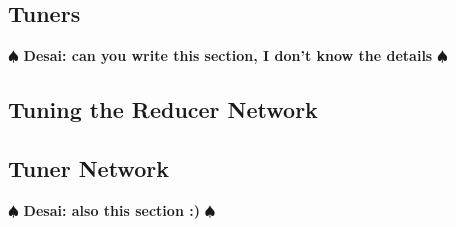 \documentclass[annual]{acmsiggraph}
\newcommand{\note}[1]{\marginpar{\LARGE $\spadesuit$}
			$\spadesuit$ {\bf #1} $\spadesuit$}
\begin{document}
\subsection{Tuners}
\note{Desai: can you write this section, I don't know the details}
\subsection{Tuning the Reducer Network}

\subsection{Tuner Network}
\note{Desai: also this section :) }
\end{document}
